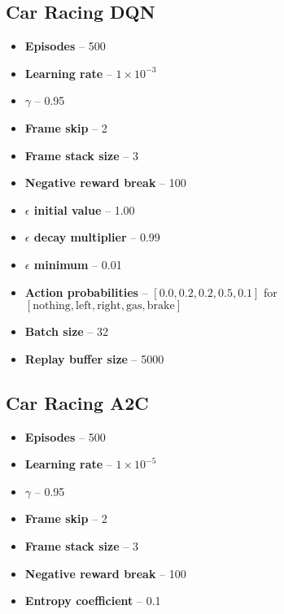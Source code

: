 \subsection*{Car Racing DQN}
\begin{itemize}
  \item \textbf{Episodes} -- 500
  \item \textbf{Learning rate} -- $1 \times 10^{-3}$
  \item \textbf{$\gamma$} -- 0.95

  \item \textbf{Frame skip} -- 2
  \item \textbf{Frame stack size} -- 3
  \item \textbf{Negative reward break} -- 100

  \item \textbf{$\epsilon$ initial value} -- 1.00
  \item \textbf{$\epsilon$ decay multiplier} -- 0.99
  \item \textbf{$\epsilon$ minimum} -- 0.01
  \item \textbf{Action probabilities} -- $[0.0, 0.2, 0.2, 0.5, 0.1]$ for $\left[\text{nothing},
            \text{left}, \text{right}, \text{gas}, \text{brake}\right]$

  \item \textbf{Batch size} -- 32
  \item \textbf{Replay buffer size} -- 5000
\end{itemize}

\subsection*{Car Racing A2C}
\begin{itemize}
  \item \textbf{Episodes} -- 500
  \item \textbf{Learning rate} -- $1 \times 10^{-5}$
  \item \textbf{$\gamma$} -- 0.95

  \item \textbf{Frame skip} -- 2
  \item \textbf{Frame stack size} -- 3
  \item \textbf{Negative reward break} -- 100

  \item \textbf{Entropy coefficient} -- 0.1
\end{itemize}
